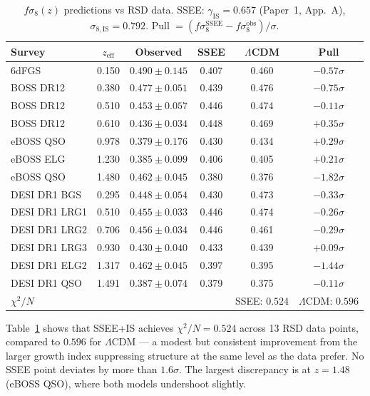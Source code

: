 \documentclass[12pt,a4paper]{article}
\begin{document}
\begin{table}[ht]
\centering
\caption{$f\sigma_8(z)$ predictions vs RSD data.
  SSEE: $\gamma_\mathrm{IS}=0.657$ (Paper~1, App.~A), $\sigma_{8,\mathrm{IS}}=0.792$.
  Pull $=(f\sigma_8^\mathrm{SSEE}-f\sigma_8^\mathrm{obs})/\sigma$.}
\label{tab:fsig8}
\begin{tabular}{lccccc}
\hline
Survey & $z_\mathrm{eff}$ & Observed & SSEE & $\Lambda$CDM & Pull \\
\hline
6dFGS & 0.150 & $0.490\pm0.145$ & 0.407 & 0.460 & $-0.57\sigma$ \\
BOSS DR12 & 0.380 & $0.477\pm0.051$ & 0.439 & 0.476 & $-0.75\sigma$ \\
BOSS DR12 & 0.510 & $0.453\pm0.057$ & 0.446 & 0.474 & $-0.11\sigma$ \\
BOSS DR12 & 0.610 & $0.436\pm0.034$ & 0.448 & 0.469 & $+0.35\sigma$ \\
eBOSS QSO & 0.978 & $0.379\pm0.176$ & 0.430 & 0.434 & $+0.29\sigma$ \\
eBOSS ELG & 1.230 & $0.385\pm0.099$ & 0.406 & 0.405 & $+0.21\sigma$ \\
eBOSS QSO & 1.480 & $0.462\pm0.045$ & 0.380 & 0.376 & $-1.82\sigma$ \\
DESI DR1 BGS & 0.295 & $0.448\pm0.054$ & 0.430 & 0.473 & $-0.33\sigma$ \\
DESI DR1 LRG1 & 0.510 & $0.455\pm0.033$ & 0.446 & 0.474 & $-0.26\sigma$ \\
DESI DR1 LRG2 & 0.706 & $0.456\pm0.034$ & 0.446 & 0.461 & $-0.29\sigma$ \\
DESI DR1 LRG3 & 0.930 & $0.430\pm0.040$ & 0.433 & 0.439 & $+0.09\sigma$ \\
DESI DR1 ELG2 & 1.317 & $0.462\pm0.045$ & 0.397 & 0.395 & $-1.44\sigma$ \\
DESI DR1 QSO & 1.491 & $0.387\pm0.074$ & 0.379 & 0.375 & $-0.11\sigma$ \\
\hline
\multicolumn{4}{l}{$\chi^2/N$} & SSEE: $0.524$ & $\Lambda$CDM: $0.596$ \\
\hline
\end{tabular}
\end{table}

Table~\ref{tab:fsig8} shows that SSEE+IS achieves $\chi^2/N=0.524$ across
13 RSD data points, compared to $0.596$ for $\Lambda$CDM — a modest but
consistent improvement from the larger growth index suppressing structure
at the same level as the data prefer.  No SSEE point deviates by more than
$1.6\sigma$. The largest discrepancy is at $z=1.48$ (eBOSS QSO),
where both models undershoot slightly.
\end{document}
